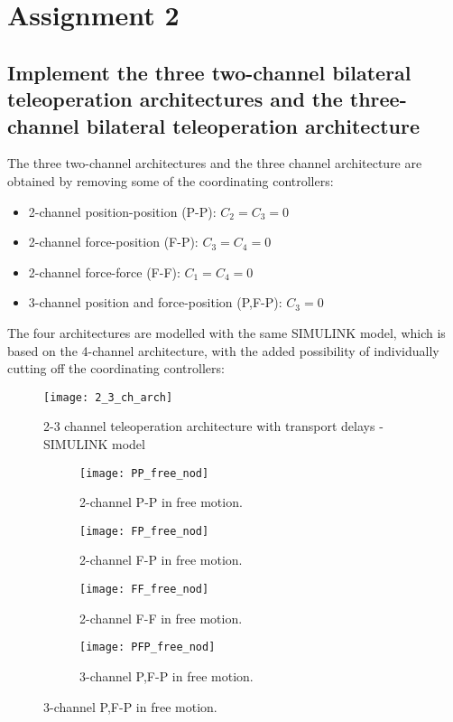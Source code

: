 \section{Assignment 2}

\subsection{Implement the three two-channel bilateral teleoperation architectures and the three-channel bilateral teleoperation architecture}

The three two-channel architectures and the three channel architecture are obtained by removing some of the coordinating controllers:

\begin{itemize}
\item 2-channel position-position (P-P): $C_2=C_3=0$
\item 2-channel force-position (F-P): $C_3=C_4=0$
\item 2-channel force-force (F-F): $C_1=C_4=0$
\item 3-channel position and force-position (P,F-P): $C_3=0$
\end{itemize}

The four architectures are modelled with the same SIMULINK model, which is based on the 4-channel architecture, with the added possibility of individually cutting off the coordinating controllers:

\begin{figure}[H]
\centering
\texttt{[image: 2\_3\_ch\_arch]}
\caption{2-3 channel teleoperation architecture with transport delays - SIMULINK model}
\end{figure}

\newpage

\begin{figure}[H]
\begin{minipage}{0.5\textwidth}
\begin{figure}[H]
\centering
\texttt{[image: PP\_free\_nod]}
\caption{2-channel P-P in free motion.}
\label{fig:pp_free}
\end{figure}
\begin{figure}[H]
\centering
\texttt{[image: FP\_free\_nod]}
\caption{2-channel F-P in free motion.}
\label{fig:fp_free}
\end{figure}
\end{minipage}
\begin{minipage}{0.5\textwidth}
\begin{figure}[H]
\centering
\texttt{[image: FF\_free\_nod]}
\caption{2-channel F-F in free motion.}
\label{fig:ff_free}
\end{figure}
\begin{figure}[H]
\centering
\texttt{[image: PFP\_free\_nod]}
\caption{3-channel P,F-P in free motion.}
\label{fig:pfp_free}
\end{figure}
\end{minipage}
\end{figure}

